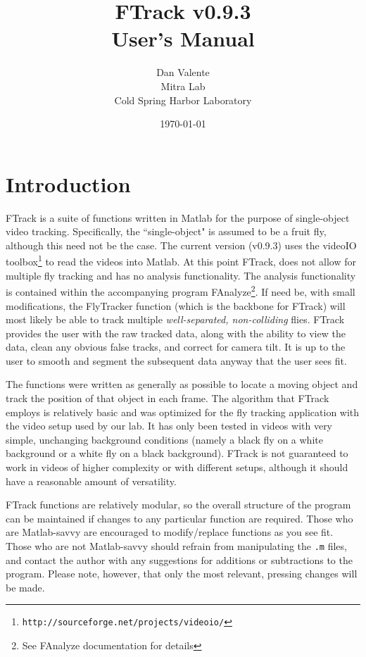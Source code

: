 \documentclass[letterpaper, 11pt]{article}
\title{FTrack v0.9.3\\User's Manual}
\author{Dan Valente\\\small{Mitra Lab}\\\small{Cold Spring Harbor Laboratory}}
\date{\today}
\begin{document}
\maketitle

\section{Introduction}

FTrack is a suite of functions written in Matlab for the purpose of single-object video tracking.
Specifically, the ``single-object" is assumed to be a fruit fly, although this need not be the
case. The current version (v0.9.3) uses the videoIO
toolbox\footnote{\texttt{http://sourceforge.net/projects/videoio/}} to read the videos into Matlab.
At this point FTrack, does not allow for multiple fly tracking and has no analysis functionality.
The analysis functionality is contained within the accompanying program FAnalyze\footnote{See
FAnalyze documentation for details}.  If need be, with small modifications, the FlyTracker function
(which is the backbone for FTrack) will most likely be able to track multiple \emph{well-separated,
non-colliding} flies. FTrack provides the user with the raw tracked data, along with the ability to
view the data, clean any obvious false tracks, and correct for camera tilt. It is up to the user to
smooth and segment the subsequent data anyway that the user sees fit.

The functions were written as generally as possible to locate a
moving object and track the position of that object in each frame.
The algorithm that FTrack employs is relatively basic and was
optimized for the fly tracking application with the video setup used
by our lab. It has only been tested in videos with very simple,
unchanging background conditions (namely a black fly on a white
background or a white fly on a black background).  FTrack is not
guaranteed to work in videos of higher complexity or with different
setups, although it should have a reasonable amount of versatility.

FTrack functions are relatively modular, so the overall structure of
the program can be maintained if changes to any particular function
are required. Those who are Matlab-savvy are encouraged to
modify/replace functions as you see fit. Those who are not
Matlab-savvy should refrain from manipulating the \texttt{.m} files,
and contact the author with any suggestions for additions or
subtractions to the program.  Please note, however, that only the
most relevant, pressing changes will be made.
\end{document}
